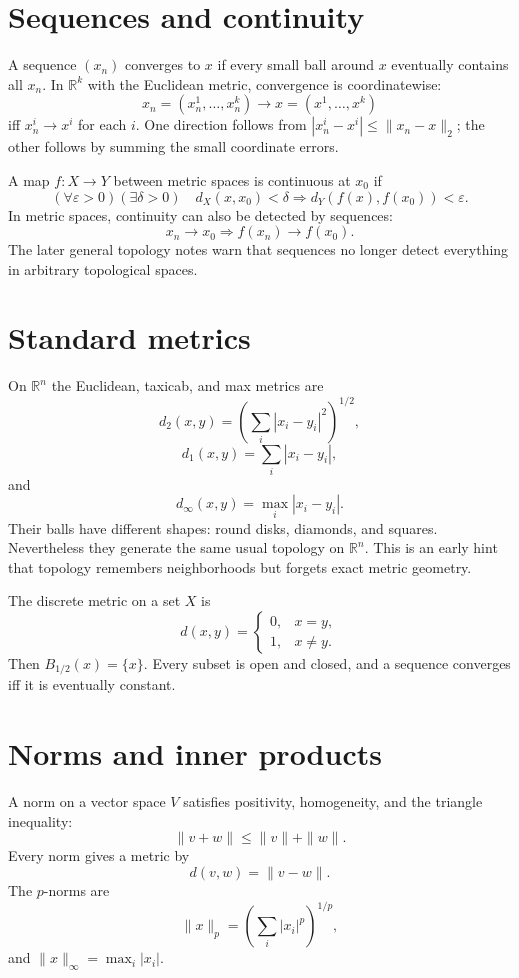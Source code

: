 \section{Sequences and continuity}

A sequence $(x_n)$ converges to $x$ if every small ball around $x$ eventually contains all $x_n$.  In $\mathbb R^k$ with the Euclidean metric, convergence is coordinatewise:
\[
  x_n=(x_n^1,\ldots,x_n^k)\to x=(x^1,\ldots,x^k)
\]
iff $x_n^i\to x^i$ for each $i$.  One direction follows from $|x_n^i-x^i|\le \|x_n-x\|_2$; the other follows by summing the small coordinate errors.

A map $f:X\to Y$ between metric spaces is continuous at $x_0$ if
\[
  (\forall \varepsilon>0)(\exists \delta>0)\quad
  d_X(x,x_0)<\delta \Rightarrow d_Y(f(x),f(x_0))<\varepsilon.
\]
In metric spaces, continuity can also be detected by sequences:
\[
  x_n\to x_0 \Rightarrow f(x_n)\to f(x_0).
\]
The later general topology notes warn that sequences no longer detect everything in arbitrary topological spaces.

\section{Standard metrics}

On $\mathbb R^n$ the Euclidean, taxicab, and max metrics are
\[
  d_2(x,y)=\left(\sum_i |x_i-y_i|^2\right)^{1/2},
\]
\[
  d_1(x,y)=\sum_i |x_i-y_i|,
\]
and
\[
  d_\infty(x,y)=\max_i |x_i-y_i|.
\]
Their balls have different shapes: round disks, diamonds, and squares.  Nevertheless they generate the same usual topology on $\mathbb R^n$.  This is an early hint that topology remembers neighborhoods but forgets exact metric geometry.

The discrete metric on a set $X$ is
\[
  d(x,y)=\begin{cases}
  0,&x=y,\\
  1,&x\ne y.
  \end{cases}
\]
Then $B_{1/2}(x)=\{x\}$.  Every subset is open and closed, and a sequence converges iff it is eventually constant.

\section{Norms and inner products}

A norm on a vector space $V$ satisfies positivity, homogeneity, and the triangle inequality:
\[
  \|v+w\|\le \|v\|+\|w\|.
\]
Every norm gives a metric by
\[
  d(v,w)=\|v-w\|.
\]
The $p$-norms are
\[
  \|x\|_p=\left(\sum_i |x_i|^p\right)^{1/p},
\]
and $\|x\|_\infty=\max_i |x_i|$.

